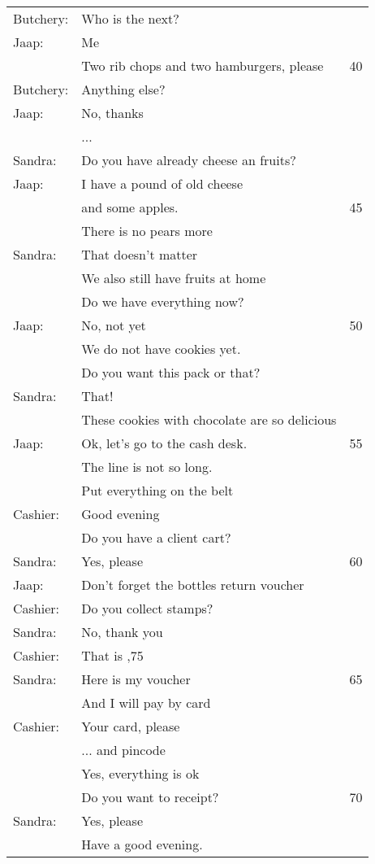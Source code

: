 \documentclass{tstextbook}
\begin{document}
		\begin{definition}
			\begin{tabular}{lll}
			Butchery: & Who is the next? &\\
			Jaap: & Me &\\
			& Two rib chops and two hamburgers, please & 40\\
			Butchery: & Anything else?& \\
			Jaap: & No, thanks &\\
			& ... &\\	
			Sandra: & Do you have already cheese an fruits? &\\
			Jaap:& I have a pound of old cheese &\\
			& and some apples. & 45\\
			& There is no pears more &\\
			Sandra: & That doesn't matter &\\
			& We also still have fruits at home &\\
			& Do we have everything now? &\\
			Jaap: & No, not yet & 50\\
			& We do not have cookies yet. &\\
			& Do you want this pack or that? &\\
			Sandra: & That! &\\
			& These cookies with chocolate are so delicious &\\
			Jaap: & Ok, let's go to the cash desk. & 55\\
			& The line is not so long.&\\
			& Put everything on the belt &\\
			Cashier: & Good evening &\\
			& Do you have a client cart? &\\
			Sandra: & Yes, please &60\\
			Jaap: & Don't forget the bottles return voucher &\\
			Cashier: & Do you collect stamps? &\\
			Sandra: & No, thank you &\\
			Cashier: & That is \texteuro 51,75 &\\
			Sandra: & Here is my voucher &65\\
			& And I will pay by card &\\
			Cashier: & Your card, please &\\
			& ... and pincode &\\
			& Yes, everything is ok &\\
			& Do you want to receipt? &70\\
			Sandra: & Yes, please &\\
			& Have a good evening.&\\
		\end{tabular}
	\end{definition}
\end{document}
